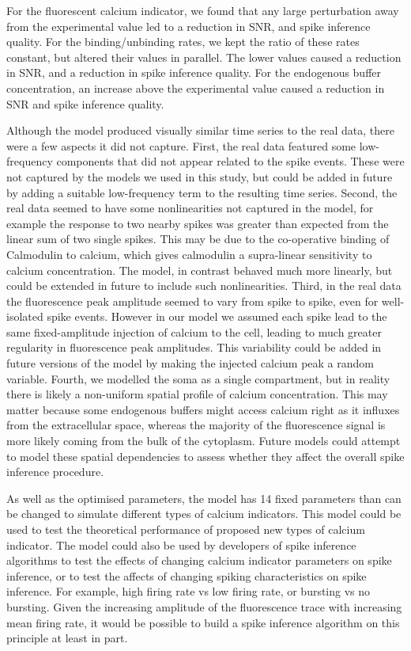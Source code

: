 For the fluorescent calcium indicator, we found that any large perturbation away from the experimental value led to a reduction in SNR, and spike inference quality. For the binding/unbinding rates, we kept the ratio of these rates constant, but altered their values in parallel. The lower values caused a reduction in SNR, and a reduction in spike inference quality. For the endogenous buffer concentration, an increase above the experimental value caused a reduction in SNR and spike inference quality.

Although the model produced visually similar time series to the real data, there were a few aspects it did not capture. First, the real data featured some low-frequency components that did not appear related to the spike events. These were not captured by the models we used in this study, but could be added in future by adding a suitable low-frequency term to the resulting time series. Second, the real data seemed to have some nonlinearities not captured in the model, for example the response to two nearby spikes was greater than expected from the linear sum of two single spikes. This may be due to the co-operative binding of Calmodulin to calcium, which gives calmodulin a supra-linear sensitivity to calcium concentration. The model, in contrast behaved much more linearly, but could be extended in future to include such nonlinearities. Third, in the real data the fluorescence peak amplitude seemed to vary from spike to spike, even for well-isolated spike events. However in our model we assumed each spike lead to the same fixed-amplitude injection of calcium to the cell, leading to much greater regularity in fluorescence peak amplitudes. This variability could be added in future versions of the model by making the injected calcium peak a random variable. Fourth, we modelled the soma as a single compartment, but in reality there is likely a non-uniform spatial profile of calcium concentration. This may matter because some endogenous buffers might access calcium right as it influxes from the extracellular space, whereas the majority of the fluorescence signal is more likely coming from the bulk of the cytoplasm. Future models could attempt to model these spatial dependencies to assess whether they affect the overall spike inference procedure.

As well as the optimised parameters, the model has 14 fixed parameters than can be changed to simulate different types of calcium indicators. This model could be used to test the theoretical performance of proposed new types of calcium indicator. The model could also be used by developers of spike inference algorithms to test the effects of changing calcium indicator parameters on spike inference, or to test the affects of changing spiking characteristics on spike inference. For example, high firing rate vs low firing rate, or bursting vs no bursting. Given the increasing amplitude of the fluorescence trace with increasing mean firing rate, it would be possible to build a spike inference algorithm on this principle at least in part.

